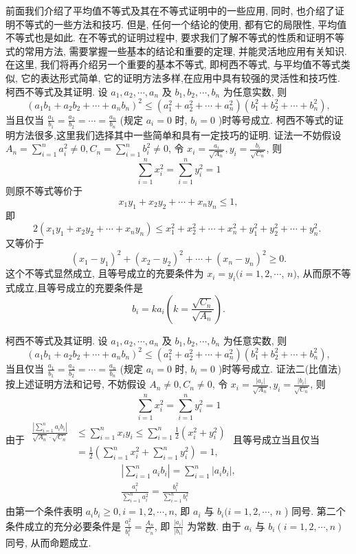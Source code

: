 
前面我们介绍了平均值不等式及其在不等式证明中的一些应用, 同时, 也介绍了证明不等式的一些方法和技巧.
但是, 任何一个结论的使用, 都有它的局限性, 平均值不等式也是如此.
在不等式的证明过程中, 要求我们了解不等式的性质和证明不等式的常用方法, 需要掌握一些基本的结论和重要的定理, 并能灵活地应用有关知识.
在这里, 我们将再介绍另一个重要的基本不等式, 即柯西不等式, 与平均值不等式类似, 它的表达形式简单, 它的证明方法多样,在应用中具有较强的灵活性和技巧性.
柯西不等式及其证明.
设 $a_1, a_2, \cdots, a_n$ 及 $b_1, b_2, \cdots, b_n$ 为任意实数, 则
$$
\left(a_1 b_1+a_2 b_2+\cdots+a_n b_n\right)^2 \leqslant\left(a_1^2+a_2^2+\cdots+a_n^2\right)\left(b_1^2+b_2^2+\cdots+b_n^2\right),
$$
当且仅当 $\frac{a_1}{b_1}=\frac{a_2}{b_2}=\cdots=\frac{a_n}{b_n}$ (规定 $a_i=0$ 时, $b_i=0$ )时等号成立.
柯西不等式的证明方法很多,这里我们选择其中一些简单和具有一定技巧的证明.
证法一不妨假设 $A_n=\sum_{i=1}^n a_i^2 \neq 0, C_n=\sum_{i=1}^n b_i^2 \neq 0$, 令 $x_i=\frac{a_i}{\sqrt{A_n}}, y_i=\frac{b_i}{\sqrt{C_n}}$,
则
$$
\sum_{i=1}^n x_i^2=\sum_{i=1}^n y_i^2=1
$$
则原不等式等价于
$$
x_1 y_1+x_2 y_2+\cdots+x_n y_n \leqslant 1,
$$
即
$$
2\left(x_1 y_1+x_2 y_2+\cdots+x_n y_n\right) \leqslant x_1^2+x_2^2+\cdots+x_n^2+y_1^2+y_2^2+\cdots+y_n^2 \text {. }
$$
又等价于
$$
\left(x_1-y_1\right)^2+\left(x_2-y_2\right)^2+\cdots+\left(x_n-y_n\right)^2 \geqslant 0 .
$$
这个不等式显然成立, 且等号成立的充要条件为 $x_i=y_i(i=1,2, \cdots$, $n)$, 从而原不等式成立,且等号成立的充要条件是
$$
b_i=k a_i\left(k=\frac{\sqrt{C_n}}{\sqrt{A_n}}\right) .
$$



柯西不等式及其证明.
设 $a_1, a_2, \cdots, a_n$ 及 $b_1, b_2, \cdots, b_n$ 为任意实数, 则
$$
\left(a_1 b_1+a_2 b_2+\cdots+a_n b_n\right)^2 \leqslant\left(a_1^2+a_2^2+\cdots+a_n^2\right)\left(b_1^2+b_2^2+\cdots+b_n^2\right),
$$
当且仅当 $\frac{a_1}{b_1}=\frac{a_2}{b_2}=\cdots=\frac{a_n}{b_n}$ (规定 $a_i=0$ 时, $b_i=0$ )时等号成立.
证法二(比值法)
按上述证明方法和记号, 不妨假设 $A_n \neq 0, C_n \neq 0$, 令 $x_i=\frac{\left|a_i\right|}{\sqrt{A_n}}, y_i= \frac{\left|b_i\right|}{\sqrt{C_n}}$, 则
$$
\sum_{i=1}^n x_i^2=\sum_{i=1}^n y_i^2=1
$$
由于 $\begin{aligned} \frac{\left|\sum_{i=1}^n a_i b_i\right|}{\sqrt{A_n} \cdot \sqrt{C_n}} & \leqslant \sum_{i=1}^n x_i y_i \leqslant \sum_{i=1}^n \frac{1}{2}\left(x_i^2+y_i^2\right) \\ & =\frac{1}{2}\left(\sum_{i=1}^n x_i^2+\sum_{i=1}^n y_i^2\right)=1,\end{aligned}$
且等号成立当且仅当
$$
\begin{gathered}
\left|\sum_{i=1}^n a_i b_i\right|=\sum_{i=1}^n\left|a_i b_i\right|, \\
\frac{a_i^2}{\sum_{i=1}^n a_i^2}=\frac{b_i^2}{\sum_{i=1}^n b_i^2}
\end{gathered}
$$
由第一个条件表明 $a_i b_i \geqslant 0, i=1,2, \cdots, n$, 即 $a_i$ 与 $b_i(i=1,2, \cdots$, $n$ ) 同号.
第二个条件成立的充分必要条件是 $\frac{a_i^2}{b_i^2}=\frac{A_n}{C_n}$, 即 $\frac{\left|a_i\right|}{\left|b_i\right|}$ 为常数.
由于 $a_i$ 与 $b_i(i=1,2, \cdots, n)$ 同号, 从而命题成立.



